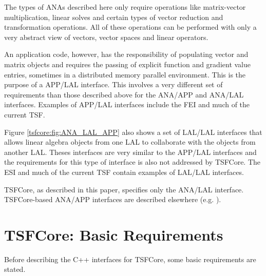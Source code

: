 The types of ANAs described here only require operations like
matrix-vector multiplication, linear solves and certain types of
vector reduction and transformation operations.  All of these
operations can be performed with only a very abstract view of vectors,
vector spaces and linear operators.

An application code, however, has the responsibility of populating
vector and matrix objects and requires the passing of explicit
function and gradient value entries, sometimes in a distributed memory
parallel environment.  This is the purpose of a APP/LAL interface.
This involves a very different set of requirements than those
described above for the ANA/APP and ANA/LAL interfaces.  Examples of
APP/LAL interfaces include the FEI {}\cite{ref:fei} and much of the
current TSF.

Figure {}\ref{tsfcore:fig:ANA_LAL_APP} also shows a set of LAL/LAL
interfaces that allows linear algebra objects from one LAL to
collaborate with the objects from another LAL.  Theses interfaces are
very similar to the APP/LAL interfaces and the requirements for this
type of interface is also not addressed by TSFCore.  The ESI
{}\cite{ref:esi_2001} and much of the current TSF contain examples of
LAL/LAL interfaces.

TSFCore, as described in this paper, specifies only the
ANA/LAL interface.  TSFCore-based ANA/APP interfaces are
described elsewhere (e.g. {}\cite{ref:TSFCore::Nonlin}).

%
\section{TSFCore: Basic Requirements}
\label{tsfcore:sec:TSFCore_requirements}
%

Before describing the C++ interfaces for TSFCore, some basic
requirements are stated.

